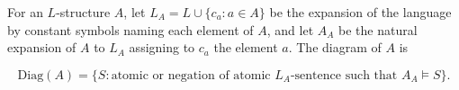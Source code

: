 For an $L$-structure $A$, let $L_A = L \cup \{c_a : a \in A\}$ be the expansion of the language by constant symbols naming each element of $A$, and let $A_A$ be the natural expansion of $A$ to $L_A$ assigning to $c_a$ the element $a$. The diagram of $A$ is

$$\text{Diag}(A) = \{S : \text{atomic or negation of atomic } L_A\text{-sentence such that } A_A \models S\}.$$
